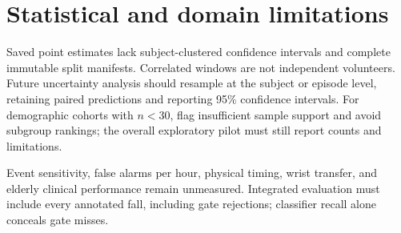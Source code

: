 \section{Statistical and domain limitations}
Saved point estimates lack subject-clustered confidence intervals and complete immutable split manifests. Correlated windows are not independent volunteers. Future uncertainty analysis should resample at the subject or episode level, retaining paired predictions and reporting 95\% confidence intervals. For demographic cohorts with $n<30$, flag insufficient sample support and avoid subgroup rankings; the overall exploratory pilot must still report counts and limitations.

Event sensitivity, false alarms per hour, physical timing, wrist transfer, and elderly clinical performance remain unmeasured. Integrated evaluation must include every annotated fall, including gate rejections; classifier recall alone conceals gate misses.
